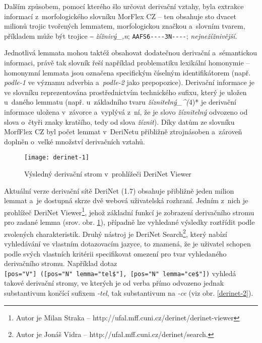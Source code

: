 Dalším způsobem, pomocí kterého šlo určovat derivační vztahy, byla
extrakce informací z~morfologického slovníku MorFlex CZ -- ten obsahuje
sto dvacet milionů trojic tvořených lemmatem, morfologickou značkou
a~slovním tvarem, příkladem může být trojice ‒ \emph{žížnivý\_,n};
\texttt{AAFS6-\/-\/-\/-3N-\/-\/-\/-}; \emph{nejnežížnivější}.
\parencite{morflex}

Jednotlivá lemmata mohou taktéž obsahovat dodatečnou derivační
a~sémantickou informaci, právě tak slovník řeší například problematiku
lexikální homonymie -- homonymní lemmata jsou označena specifickým
číselným identifikátorem (např. \emph{podle-1} ve významu adverbia
a~\emph{podle-2} jako prepopozice). Derivační informace je ve slovníku
reprezentována prostřednictvím technického sufixu, který je uložen
u~daného lemmatu (např. u~základního tvaru \emph{žíznitelný\_\^{}(}4)* je
derivační informace uložena v~závorce a~vyplývá z~ní, že je slovo
\emph{žíznitelný} odvozeno od slova o~čtyři znaky kratšího, tedy od
slova \emph{žíznit}). Díky datům ze slovníku MorfFlex CZ byl počet
lemmat v~DeriNetu přibližně ztrojnásoben a~zároveň doplněn o~velké
množství derivačních vztahů. \parencite{sevcikova16}

\begin{figure}[ht]   
    \centering
    \texttt{[image: derinet-1]}  
    \caption{Výsledný derivační strom v~prohlížeči DeriNet Viewer \parencite{derinet}}
    \label{derinet-1}
 \end{figure}

Aktuální verze derivační sítě DeriNet (1.7) obsahuje přibližně jeden
milion lemmat a~je dostupná skrze dvě webová uživatelská rozhraní.
Jedním z~nich je prohlížeč DeriNet
Viewer\footnote{Autor je Milan Straka -- http://ufal.mff.cuni.cz/derinet/derinet-viewer},
jehož základní funkcí je zobrazení derivačního stromu pro zadané lemma
(srov. obr. \ref{derinet-1}), případně lze vyhledané výsledky roztřídit
podle zvolených charakteristik. Druhý nástroj je DeriNet
Search\footnote{Autor je Jonáš Vidra -- http://ufal.mff.cuni.cz/derinet/search.},
který nabízí vyhledávání ve vlastním dotazovacím jazyce, to znamená, že
je uživatel schopen podle svých vlastních kritérii specifikovat omezení
pro tvar vyhledaného derivačního stromu. Například dotaz
\texttt{{[}pos="V"{]}\ ({[}pos="N"\ lemma="tel\$"{]},\ {[}pos="N"\ lemma="ce\$"{]})}
vyhledá takové derivační stromy, ve kterých je od verba přímo odvozeno
jednak substantivum končící sufixem \emph{-tel}, tak substantivum na
\emph{-ce} (viz obr. \ref{derinet-2}). \parencite{derinet-cz}

